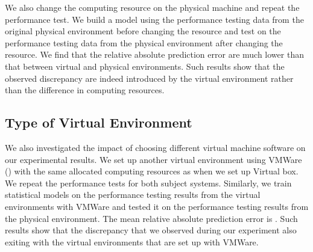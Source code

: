 We also change the computing resource on the physical machine and repeat the performance test. We build a model using the performance testing data from the original physical environment before changing the resource and test on the performance testing data from the physical environment after changing the resource. We find that the relative absolute prediction error are much lower than that between virtual and physical environments. Such results show that the observed discrepancy are indeed introduced by the virtual environment rather than the difference in computing resources.




\subsection{Type of Virtual Environment}

We also investigated the impact of choosing different virtual machine software on our experimental results. We set up another virtual environment using VMWare () with the same allocated computing resources as when we set up Virtual box. We repeat the performance tests for both subject systems. Similarly, we train statistical models on the performance testing results from the virtual environments with VMWare and tested it on the performance testing results from the physical environment. The mean relative absolute prediction error is . Such results show that the discrepancy that we observed during our experiment also exiting with the virtual environments that are set up with VMWare.




